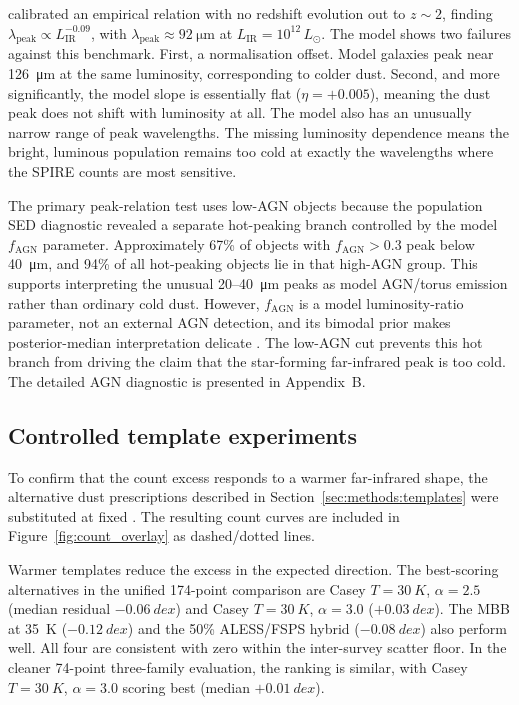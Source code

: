 \documentclass[12pt,a4paper]{article}
\begin{document}
\citet{Drew_2022} calibrated an empirical relation with no redshift evolution out to
$z \sim 2$, finding
$\lambda_\mathrm{peak} \propto L_\mathrm{IR}^{-0.09}$, with
$\lambda_\mathrm{peak} \approx \SI{92}{\um}$ at
$L_\mathrm{IR} = 10^{12}\,L_\odot$. The \popcosmos{} model shows two failures against
this benchmark. First, a normalisation offset. Model galaxies peak near \SI{126}{\um}
at the same luminosity, corresponding to colder dust. Second, and more significantly,
the model slope is essentially flat ($\eta = +0.005$), meaning the dust peak does not
shift with luminosity at all. The model also has an unusually narrow range of peak
wavelengths. The missing luminosity dependence means the bright, luminous population
remains too cold at exactly the wavelengths where the SPIRE counts are most sensitive.

The primary peak-relation test uses low-AGN objects because the population SED
diagnostic revealed a separate hot-peaking branch controlled by the model
$f_\mathrm{AGN}$ parameter. Approximately 67\% of objects with $f_\mathrm{AGN} > 0.3$
peak below \SI{40}{\um}, and 94\% of all hot-peaking objects lie in that high-AGN
group. This supports interpreting the unusual 20--\SI{40}{\um} peaks as model AGN/torus
emission rather than ordinary cold dust. However, $f_\mathrm{AGN}$ is a model
luminosity-ratio parameter, not an external AGN detection, and its bimodal prior makes
posterior-median interpretation delicate \citep{Thorp_2025_insights}. The low-AGN cut
prevents this hot branch from driving the claim that the star-forming far-infrared peak
is too cold. The detailed AGN diagnostic is presented in Appendix~B.

\subsection{Controlled template experiments}
\label{sec:results:templates}

To confirm that the count excess responds to a warmer far-infrared shape, the
alternative dust prescriptions described in Section~\ref{sec:methods:templates} were
substituted at fixed \LIR{}. The resulting count curves are included in
Figure~\ref{fig:count_overlay} as dashed/dotted lines.

Warmer templates reduce the excess in the expected direction. The best-scoring
alternatives in the unified 174-point comparison are Casey $T = \SI{30}{K}$,
$\alpha = 2.5$ (median residual $-\SI{0.06}{dex}$) and Casey $T = \SI{30}{K}$,
$\alpha = 3.0$ ($+\SI{0.03}{dex}$). The MBB at \SI{35}{K} ($-\SI{0.12}{dex}$) and the
50\% ALESS/FSPS hybrid ($-\SI{0.08}{dex}$) also perform well. All four are consistent
with zero within the inter-survey scatter floor. In the cleaner 74-point three-family
evaluation, the ranking is similar, with Casey $T = \SI{30}{K}$, $\alpha = 3.0$ scoring
best (median $+\SI{0.01}{dex}$).
\end{document}

